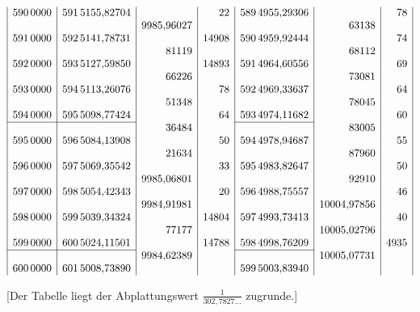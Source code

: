 {\[\begin{array}{|r|r|r|r|r|r|r|}
590\,0000&591\,5155{,}82704&&22&589\,4955{,}29306&&78\\
&&9985{,}96027&&&63138&\\
591\,0000&592\,5141{,}78731&&14908&590\,4959{,}92444&&74\\
&&81119&&&68112&\\
592\,0000&593\,5127{,}59850&&14893&591\,4964{,}60556&&69\\
&&66226&&&73081&\\
593\,0000&594\,5113{,}26076&&78&592\,4969{,}33637&&64\\
&&51348&&&78045&\\
594\,0000&595\,5098{,}77424&&64&593\,4974{,}11682&&60\\
\cline{1-2}\cline{5-5}
&&36484&&&83005&\\
595\,0000&596\,5084{,}13908&&50&594\,4978{,}94687&&55\\
&&21634&&&87960&\\
596\,0000&597\,5069{,}35542&&33&595\,4983{,}82647&&50\\
&&9985{,}06801&&&92910&\\
597\,0000&598\,5054{,}42343&&20&596\,4988{,}75557&&46\\
&&9984{,}91981&&&10004{,}97856&\\
598\,0000&599\,5039{,}34324&&14804&597\,4993{,}73413&&40\\
&&77177&&&10005{,}02796&\\
599\,0000&600\,5024{,}11501&&14788&598\,4998{,}76209&&4935\\
\cline{1-2}\cline{5-5}
&&9984{,}62389&&&10005{,}07731&\\
600\,0000&601\,5008{,}73890&&&599\,5003{,}83940&&\\
\end{array}\]
}
\begin{center}[Der Tabelle liegt der Abplattungswert \(\frac1{302{,}7827\ldots}\) zugrunde.]\end{center}


